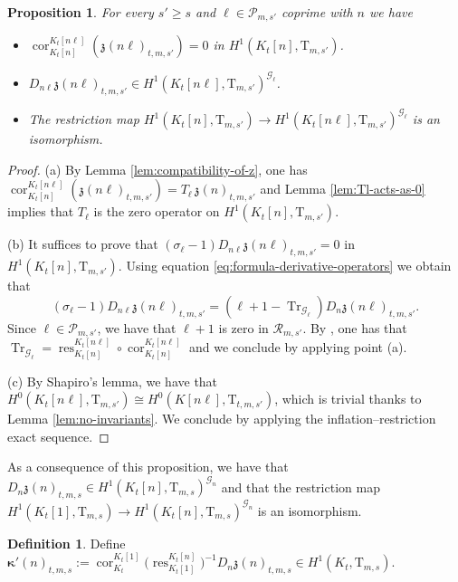 \documentclass[12pt,reqno]{amsart}
\newtheorem{proposition}[theorem]{Proposition}
\theoremstyle{definition}
\newtheorem{definition}[theorem]{Definition}
\theoremstyle{remark}
\newcommand{\T}{\boldsymbol{\mathrm{T}}}
\newcommand{\calR}{\mathcal{R}}
\DeclareMathOperator{\Tr}{Tr}
\DeclareMathOperator{\Cor}{cor}
\DeclareMathOperator{\res}{res}
\newcommand{\gk}{\kappa}
\newcommand{\gs}{\sigma}
\begin{document}
\begin{proposition}\label{prop:first-descent-results}
    For every $s'\ge s$ and $\ell\in\mathcal{P}_{m,s'}$ coprime with $n$ we have
    \begin{itemize}
        \item[(a)] $ \Cor_{K_t[n]}^{K_t[n\ell]}(\mathfrak{z}(n\ell)_{t,m,s'})=0$ in $H^1(K_t[n],\T_{m,s'})$.
        \item[(b)] $D_{n\ell}\mathfrak{z}(n\ell)_{t,m,s'}\in H^1(K_t[n\ell],\T_{m,s'})^{\mathcal{G}_\ell}$.
        \item[(c)] The restriction map $H^1(K_t[n], \T_{m,s'})\to H^1(K_t[n\ell],\T_{m,s'})^{\mathcal{G}_\ell}$ is an isomorphism.
    \end{itemize}
\end{proposition}
\begin{proof}
    (a) By Lemma \ref{lem:compatibility-of-z}, one has $\Cor_{K_t[n]}^{K_t[n\ell]}(\mathfrak{z}(n\ell)_{t,m,s'})=T_{\ell} \,\mathfrak{z}(n)_{t,m,s'}$ and Lemma \ref{lem:Tl-acts-as-0} implies that $T_{\ell}$ is the zero operator on $H^1(K_t[n],\T_{m,s'})$.

    (b) It suffices to prove that $(\gs_{\ell}-1)D_{n\ell}\mathfrak{z}(n\ell)_{t,m,s'}=0$
    in $H^1(K_t[n],\T_{m,s'})$. Using equation \eqref{eq:formula-derivative-operators} we obtain that
		\begin{equation*}
		(\gs_{\ell}-1)D_{n\ell}\mathfrak{z}(n\ell)_{t,m,s'}=(\ell+1-\Tr_{\mathcal{G}_{\ell}})D_{n}\mathfrak{z}(n\ell)_{t,m,s'}.
		\end{equation*}
		Since $\ell\in\mathcal{P}_{m,s'}$, we have that $\ell+1$ is zero in $\calR_{m,s'}$. By  \cite[Corollary 1.5.7]{Neukirch-Schmidt-Wingberg:cohomology-of-number-fields}, one has that $\Tr_{\mathcal{G}_{\ell}}=\res_{K_t[n]}^{K_t[n\ell]}\circ \Cor_{K_t[n]}^{K_t[n\ell]}$ and we conclude by applying point (a).

    (c) By Shapiro's lemma, we have that $H^0(K_t[n\ell],\T_{m,s'})\cong H^0(K[n\ell],\T_{t,m,s'})$, which is trivial thanks to Lemma \ref{lem:no-invariants}. We conclude by applying the inflation--restriction exact sequence.
\end{proof}

As a consequence of this proposition, we have that $D_n\mathfrak{z}(n)_{t,m,s}\in H^1(K_t[n],\T_{m,s})^{\mathcal{G}_n}$ and that the restriction map $H^1(K_t[1], \T_{m,s})\to H^1(K_t[n],\T_{m,s})^{\mathcal{G}_n}$ is an isomorphism.



\begin{definition}\label{def:derived-classes}
Define $\boldsymbol{\gk}'(n)_{t,m,s}:=\Cor_{K_t}^{K_t[1]}\big(\res_{K_t[1]}^{K_t[n]}\big)^{-1}D_n\mathfrak{z}(n)_{t,m,s}\in H^1(K_t, \T_{m,s})$.
\end{definition}
\end{document}

